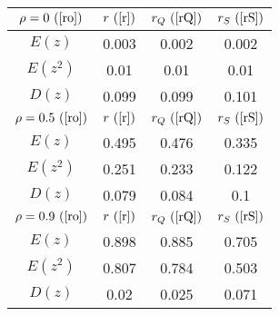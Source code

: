 \begin{tabular}{|c|c|c|c|}
\hline
$\rho = 0~(
\ref{ro})$ & $r ~(
\ref{r})$ & $r_Q ~(
\ref{rQ})$ & $r_S ~(
\ref{rS})$\\
\hline
$E(z)$ & 0.003 & 0.002 & 0.002\\
\hline
$E(z^2)$ & 0.01 & 0.01 & 0.01\\
\hline
$D(z)$ & 0.099 & 0.099 & 0.101\\
\hline
$\rho = 0.5~(
\ref{ro})$ & $r ~(
\ref{r})$ & $r_Q ~(
\ref{rQ})$ & $r_S ~(
\ref{rS})$\\
\hline
$E(z)$ & 0.495 & 0.476 & 0.335\\
\hline
$E(z^2)$ & 0.251 & 0.233 & 0.122\\
\hline
$D(z)$ & 0.079 & 0.084 & 0.1\\
\hline
$\rho = 0.9~(
\ref{ro})$ & $r ~(
\ref{r})$ & $r_Q ~(
\ref{rQ})$ & $r_S ~(
\ref{rS})$\\
\hline
$E(z)$ & 0.898 & 0.885 & 0.705\\
\hline
$E(z^2)$ & 0.807 & 0.784 & 0.503\\
\hline
$D(z)$ & 0.02 & 0.025 & 0.071\\
\hline
\end{tabular}